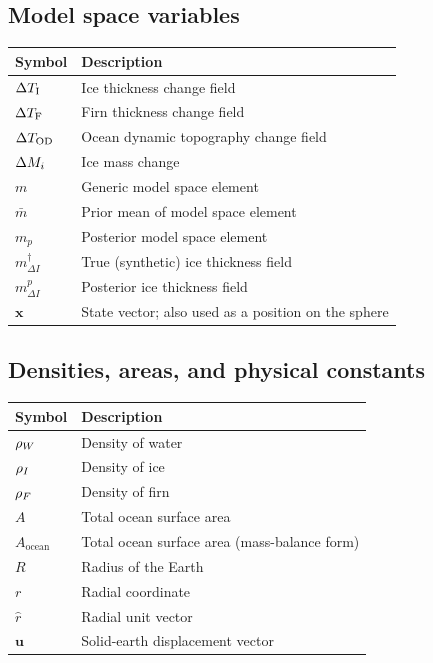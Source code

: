 \vspace{1em}

\subsection*{Model space variables}

\begin{longtable}{@{}lp{10cm}@{}}
    \toprule
    \textbf{Symbol} & \textbf{Description} \\
    \midrule
    $\Delta T_\text{I}$              & Ice thickness change field \\
    $\Delta T_\text{F}$             & Firn thickness change field \\
    $\Delta T_\text{OD}$                       & Ocean dynamic topography change field \\
    $\Delta M_{i}$                   & Ice mass change \\
    $m$                                & Generic model space element \\
    $\bar{m}$                          & Prior mean of model space element \\
    $m_p$                              & Posterior model space element \\
    $m_{\Delta I}^{\dagger}$           & True (synthetic) ice thickness field \\
    $m_{\Delta I}^{p}$                 & Posterior ice thickness field \\
    $\mathbf{x}$                       & State vector; also used as a position on the sphere \\
    \bottomrule
\end{longtable}

\vspace{1em}

\subsection*{Densities, areas, and physical constants}

\begin{longtable}{@{}lp{10cm}@{}}
    \toprule
    \textbf{Symbol} & \textbf{Description} \\
    \midrule
    $\rho_W$            & Density of water \\
    $\rho_I$            & Density of ice \\
    $\rho_F$ & Density of firn \\
    $A$                 & Total ocean surface area \\
    $A_{\text{ocean}}$  & Total ocean surface area (mass-balance form) \\
    $R$                 & Radius of the Earth \\
    $r$                 & Radial coordinate \\
    $\hat{r}$           & Radial unit vector \\
    $\mathbf{u}$        & Solid-earth displacement vector \\
    \bottomrule
\end{longtable}

